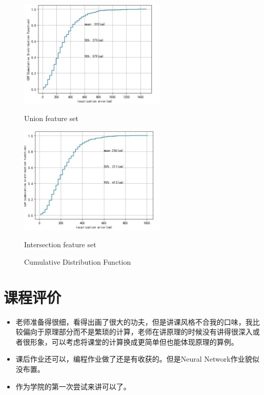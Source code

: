\documentclass[UTF-8, a4paper, 10pt]{article}
\numberwithin{equation}{section}
\begin{document}
\begin{figure}
  \centering
  \begin{minipage}[t]{7.5cm}
    \includegraphics[width=7cm]{cdf_union.png}
    \centerline{Union feature set}
  \end{minipage}
  \begin{minipage}[t]{7.5cm}
    \includegraphics[width=7cm]{cdf.png}
    \centerline{Intersection feature set}
  \end{minipage}
  \caption{Cumulative Distribution Function}
  \label{CDF}
\end{figure}

\section{课程评价}
\begin{itemize}
  \item 老师准备得很细，看得出画了很大的功夫，但是讲课风格不合我的口味，我比较偏向于原理部分而不是繁琐的计算，老师在讲原理的时候没有讲得很深入或者很形象，可以考虑将课堂的计算换成更简单但也能体现原理的算例。
  \item 课后作业还可以，编程作业做了还是有收获的。但是Neural Network作业貌似没布置。
  \item 作为学院的第一次尝试来讲可以了。
\end{itemize}
\end{document}
